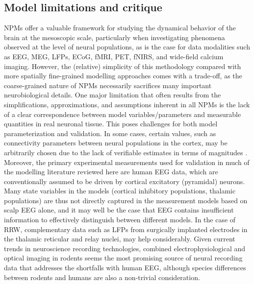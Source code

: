 \documentclass[12pt,twoside]{article}
\begin{document}

\subsection{Model limitations and critique}
NPMs offer a valuable framework for studying the dynamical behavior of the brain at the mesoscopic scale, particularly when investigating phenomena observed at the level of neural populations, as is the case for data modalities such as EEG, MEG, LFPs, ECoG, fMRI, PET, fNIRS, and wide-field calcium imaging. However, the (relative) simplicity of this methodology compared with more spatially fine-grained modelling approaches comes with a trade-off, as the coarse-grained nature of NPMs necessarily sacrifices many important neurobiological details. One major limitation that often results from the simplifications, approximations, and assumptions inherent in all NPMs is the lack of a clear  correspondence between model variables/parameters and measurable quantities in real neuronal tissue.
This poses challenges for both model parameterization and validation. In some cases, certain values, such as connectivity parameters between neural populations in the cortex, may be arbitrarily chosen due to the lack of verifiable estimates in terms of magnitudes \citep{cook2021neural}. Moreover, the primary experimental measurements used for validation in much of the modelling literature reviewed here are human EEG data, which are conventionally assumed to be driven by cortical excitatory (pyramidal) neurons. Many state variables in the models (cortical inhibitory populations, thalamic populations) are thus not directly captured in the measurement models based on scalp EEG alone, and it may well be the case that EEG contains insufficient information to effectively distinguish between different models. In the case of RRW, complementary data such as LFPs from surgically implanted electrodes in the thalamic reticular and relay nuclei, may help considerably. Given current trends in neuroscience recording technologies, combined electrophysiological and optical imaging in rodents seems the most promising source of neural recording data that addresses the shortfalls with human EEG, although species differences between rodents and humans are also a non-trivial consideration. 
\end{document}
